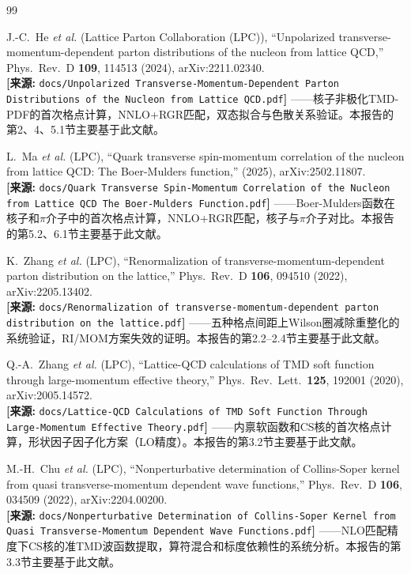 \documentclass[12pt,a4paper]{ctexart}
\theoremstyle{definition}
\begin{document}
\begin{thebibliography}{99}

J.-C.~He \textit{et al.} (Lattice Parton Collaboration (LPC)),
``Unpolarized transverse-momentum-dependent parton distributions of the nucleon from lattice QCD,''
Phys.\ Rev.\ D \textbf{109}, 114513 (2024), arXiv:2211.02340.
\\\textbf{[来源:} \texttt{docs/Unpolarized Transverse-Momentum-Dependent Parton Distributions of the Nucleon from Lattice QCD.pdf}\textbf{]}
——核子非极化TMD-PDF的首次格点计算，NNLO+RGR匹配，双态拟合与色散关系验证。本报告的第2、4、5.1节主要基于此文献。

L.~Ma \textit{et al.} (LPC),
``Quark transverse spin-momentum correlation of the nucleon from lattice QCD: The Boer-Mulders function,''
(2025), arXiv:2502.11807.
\\\textbf{[来源:} \texttt{docs/Quark Transverse Spin-Momentum Correlation of the Nucleon from Lattice QCD The Boer-Mulders Function.pdf}\textbf{]}
——Boer-Mulders函数在核子和$\pi$介子中的首次格点计算，NNLO+RGR匹配，核子与$\pi$介子对比。本报告的第5.2、6.1节主要基于此文献。

K.~Zhang \textit{et al.} (LPC),
``Renormalization of transverse-momentum-dependent parton distribution on the lattice,''
Phys.\ Rev.\ D \textbf{106}, 094510 (2022), arXiv:2205.13402.
\\\textbf{[来源:} \texttt{docs/Renormalization of transverse-momentum-dependent parton distribution on the lattice.pdf}\textbf{]}
——五种格点间距上Wilson圈减除重整化的系统验证，RI/MOM方案失效的证明。本报告的第2.2--2.4节主要基于此文献。

Q.-A.~Zhang \textit{et al.} (LPC),
``Lattice-QCD calculations of TMD soft function through large-momentum effective theory,''
Phys.\ Rev.\ Lett.\ \textbf{125}, 192001 (2020), arXiv:2005.14572.
\\\textbf{[来源:} \texttt{docs/Lattice-QCD Calculations of TMD Soft Function Through Large-Momentum Effective Theory.pdf}\textbf{]}
——内禀软函数和CS核的首次格点计算，形状因子因子化方案（LO精度）。本报告的第3.2节主要基于此文献。

M.-H.~Chu \textit{et al.} (LPC),
``Nonperturbative determination of Collins-Soper kernel from quasi transverse-momentum dependent wave functions,''
Phys.\ Rev.\ D \textbf{106}, 034509 (2022), arXiv:2204.00200.
\\\textbf{[来源:} \texttt{docs/Nonperturbative Determination of Collins-Soper Kernel from Quasi Transverse-Momentum Dependent Wave Functions.pdf}\textbf{]}
——NLO匹配精度下CS核的准TMD波函数提取，算符混合和标度依赖性的系统分析。本报告的第3.3节主要基于此文献。


\end{thebibliography}
\end{document}

